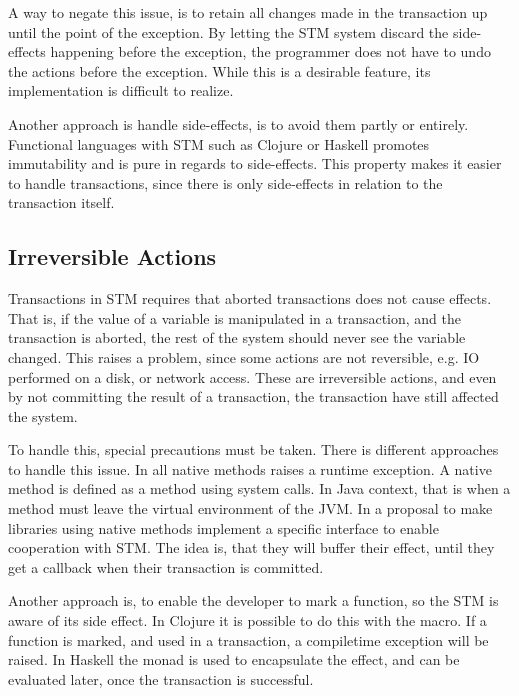 A way to negate this issue, is to retain all changes made in the transaction up until the point of the exception. By letting the \ac{STM} system discard the side-effects happening before the exception, the programmer does not have to undo the actions before the exception. While this is a desirable feature, its implementation is difficult to realize\cite[p. 3]{harris2005exceptions}.

Another approach is handle side-effects, is to avoid them partly or entirely. Functional languages with \ac{STM} such as Clojure or Haskell promotes immutability and is pure in regards to side-effects. This property makes it easier to handle transactions, since there is only side-effects in relation to the transaction itself. 

\subsection{Irreversible Actions}
\label{subsec:stm_irreversible_actions}
Transactions in \ac{STM} requires that aborted transactions does not cause effects. That is, if the value of a variable is manipulated in a transaction, and the transaction is aborted, the rest of the system should never see the variable changed. This raises a problem, since some actions are not reversible, e.g. \ac{IO} performed on a disk, or network access. These are irreversible actions, and even by not committing the result of a transaction, the transaction have still affected the system. 

To handle this, special precautions must be taken. There is different approaches to handle this issue. In \cite[p. 4]{harris2003language} all native methods raises a runtime exception. A native method is defined as a method using system calls. In Java context, that is when a method must leave the virtual environment of the \ac{JVM}. In \cite{harris2005exceptions} a proposal to make libraries using native methods implement a specific interface to enable cooperation with \ac{STM}. The idea is, that they will buffer their effect, until they get a callback when their transaction is committed. 

Another approach is, to enable the developer to mark a function, so the \ac{STM} is aware of its side effect. In Clojure it is possible to do this with the  macro. If a function is marked, and used in a transaction, a compiletime exception will be raised. In Haskell the  monad is used to encapsulate the effect, and can be evaluated later, once the transaction is successful.

